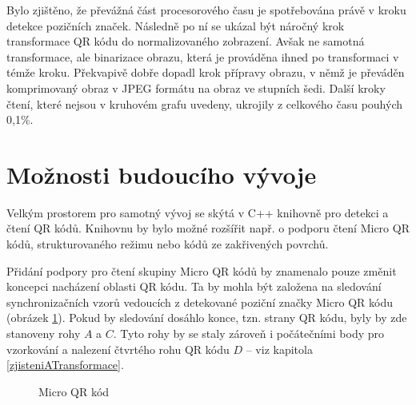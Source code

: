 Bylo zjištěno, že převážná část procesorového času je spotřebována právě v kroku
detekce pozičních značek. Následně po ní se ukázal být náročný krok transformace
QR kódu do normalizovaného zobrazení. Avšak ne samotná transformace, ale
binarizace obrazu, která je prováděna ihned po transformaci v témže kroku.
Překvapivě dobře dopadl krok přípravy obrazu, v němž je převáděn
komprimovaný obraz v JPEG formátu na obraz ve stupních šedi. Další kroky čtení, které nejsou
v kruhovém grafu uvedeny, ukrojily z celkového času pouhých 0,1\%.

\section{Možnosti budoucího vývoje}
\label{rozsireniBudouciVyvoj}

Velkým prostorem pro samotný vývoj se skýtá v C++ knihovně pro detekci a čtení
QR kódů. Knihovnu by bylo možné rozšířit např. o podporu čtení Micro QR kódů,
strukturovaného režimu nebo kódů ze zakřivených povrchů.

Přidání podpory pro čtení skupiny Micro QR kódů by znamenalo pouze změnit
koncepci nacházení oblasti QR kódu. Ta by mohla být založena na sledování
synchronizačních vzorů vedoucích z detekované poziční značky Micro QR kódu
(obrázek \ref{microQRCodePoints}).
Pokud by sledování dosáhlo konce, tzn. strany QR kódu, byly by zde stanoveny
rohy $A$ a $C$. Tyto rohy by se staly zároveň i počátečními body pro vzorkování
a nalezení čtvrtého rohu QR kódu $D$ -- viz kapitola
\ref{zjisteniATransformace}.

 \begin{figure}[H]
  \begin{center}
    \caption{Micro QR kód}
    \label{microQRCodePoints}
  \end{center}
\end{figure}

